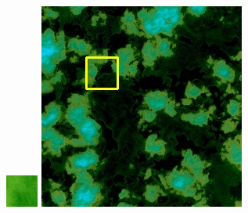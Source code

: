 \documentclass[UTF8]{ctexart}
\begin{document}
\begin{figure}[H]
{\begin{minipage}[b]{0.15\linewidth}
            \includegraphics[width=1\linewidth]{../log/spoon2/cut/tmp_cut_LC81321192014054LGN00_03055_spectral.jpg}\vspace{4pt}
            \includegraphics[width=1\linewidth]{../log/spoon2/cut/LC80350192014190LGN00_06561_spectral.jpg}\vspace{4pt}

\end{minipage}}
\end{figure}
\end{document}
